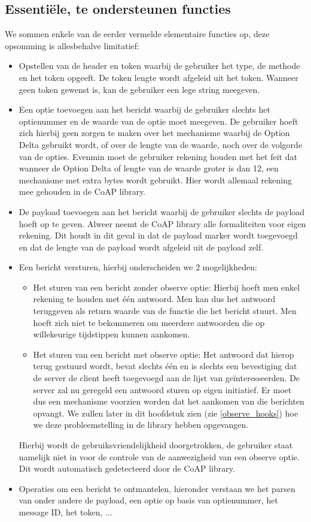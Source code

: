 \subsection{Essenti\"{e}le, te ondersteunen functies} \label{essentielefuncties}

We sommen enkele van de eerder vermelde elementaire functies op, deze opsomming is allesbehalve limitatief:

\begin{itemize}
\item Opstellen van de header en token waarbij de gebruiker het type, de methode en het token opgeeft. De token lengte wordt afgeleid uit het token. Wanneer geen token gewenst is, kan de gebruiker een lege string meegeven.
\item Een optie toevoegen aan het bericht waarbij de gebruiker slechts het optienummer en de waarde van de optie moet meegeven. De gebruiker hoeft zich hierbij geen zorgen te maken over het mechanisme waarbij de Option Delta gebruikt wordt, of over de lengte van de waarde, noch over de volgorde van de opties. Evenmin moet de gebruiker rekening houden met het feit dat wanneer de Option Delta of lengte van de waarde groter is dan 12, een mechanisme met extra bytes wordt gebruikt. Hier wordt allemaal rekening mee gehouden in de CoAP library.
\item De payload toevoegen aan het bericht waarbij de gebruiker slechts de payload hoeft op te geven. Alweer neemt de CoAP library alle formaliteiten voor eigen rekening. Dit houdt in dit geval in dat de payload marker wordt toegevoegd en dat de lengte van de payload wordt afgeleid uit de payload zelf.
\item Een bericht versturen, hierbij onderscheiden we 2 mogelijkheden:
\begin{itemize}
\item Het sturen van een bericht zonder observe optie: Hierbij hoeft men enkel rekening te houden met \'{e}\'{e}n antwoord. Men kan dus het antwoord teruggeven als return waarde van de functie die het bericht stuurt. Men hoeft zich niet te bekommeren om meerdere antwoorden die op willekeurige tijdstippen kunnen aankomen.
\item Het sturen van een bericht met observe optie: Het antwoord dat hierop terug gestuurd wordt, bevat slechts \'{e}\'{e}n en is slechts een bevestiging dat de server de client heeft toegevoegd aan de lijst van ge\"{i}nteresseerden. De server zal nu geregeld een antwoord sturen op eigen initiatief. Er moet dus een mechanisme voorzien worden dat het aankomen van die berichten opvangt. We zullen later in dit hoofdstuk zien (zie \ref{observe_hooks}) hoe we deze probleemstelling in de library hebben opgevangen.
\end{itemize}
Hierbij wordt de gebruiksvriendelijkheid doorgetrokken, de gebruiker staat namelijk niet in voor de controle van de aanwezigheid van een observe optie. Dit wordt automatisch gedetecteerd door de CoAP library.
\item Operaties om een bericht te ontmantelen, hieronder verstaan we het parsen van onder andere de payload, een optie op basis van optienummer, het message ID, het token, ...
\end{itemize}

